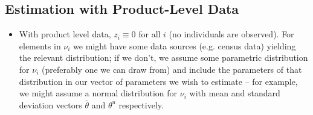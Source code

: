 \documentclass[11pt]{article}
\numberwithin{equation}{section}
\begin{document}
\subsection{Estimation with Product-Level Data}
	\begin{itemize}
		\item With product level data, $z_i\equiv 0$ for all $i$ (no individuals are observed). For elements in $\nu_i$ we might have some data sources (e.g. census data) yielding the relevant distribution; if we don't, we assume some parametric distribution for $\nu_i$ (preferably one we can draw from) and include the parameters of that distribution in our vector of parameters we wish to estimate -- for example, we might assume a normal distribution for $\nu_i$ with mean and standard deviation vectors $\bar{\theta}$ and $\theta^u$ respectively.


\end{itemize}
\end{document}

